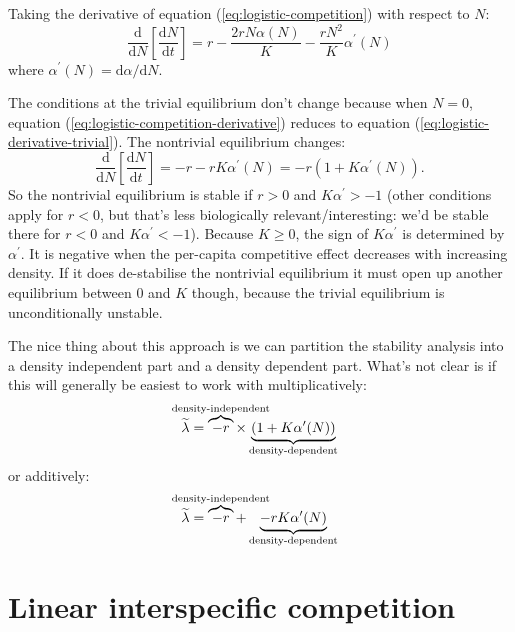 \documentclass[12pt,a4paper]{article}
\newcommand{\ud}{\mathrm{d}}
\begin{document}
Taking the derivative of equation (\ref{eq:logistic-competition}) with
respect to $N$:
\begin{equation}
  \label{eq:logistic-competition-derivative}
  \frac{\ud}{\ud N}\left[\frac{\ud N}{\ud t}\right]
   = r - \frac{2 r N\alpha(N)}{K} - \frac{rN^2}{K}\alpha^\prime(N)
\end{equation}
where $\alpha^\prime(N) = \ud \alpha/\ud N$.

The conditions at the trivial equilibrium don't change because when $N
= 0$, equation (\ref{eq:logistic-competition-derivative}) reduces to
equation (\ref{eq:logistic-derivative-trivial}).  The nontrivial
equilibrium changes:
\begin{equation}
  \label{eq:logistic-competition-derivative-nontrivial}
  \frac{\ud}{\ud N}\left[\frac{\ud N}{\ud t}\right]
   = -r - rK\alpha^\prime(N) = -r(1 + K\alpha^\prime(N)).
\end{equation}
So the nontrivial equilibrium is stable if $r > 0$ and $K\alpha^\prime
> -1$ (other conditions apply for $r < 0$, but that's less
biologically relevant/interesting: we'd be stable there for $r < 0$
and $K\alpha^\prime < -1$).  Because $K \geq 0$, the sign of
$K\alpha^\prime$ is determined by $\alpha^\prime$.  It is negative
when the per-capita competitive effect decreases with increasing
density.  If it does de-stabilise the nontrivial equilibrium it must
open up another equilibrium between 0 and $K$ though, because the
trivial equilibrium is unconditionally unstable.

The nice thing about this approach is we can partition the stability
analysis into a density independent part and a density dependent
part.  What's not clear is if this will generally be easiest to work
with multiplicatively:
\begin{equation}
  \label{eq:logistic-comptition-partition-multiplicative}
  \widetilde \lambda =
  \overbrace{-r}^{\mathclap{\text{density-independent}}}
  \times
  \underbrace{(1 + K\alpha^\prime(N))}_{\text{density-dependent}}
\end{equation}
or additively:
\begin{equation}
  \label{eq:logistic-comptition-partition-additive}
  \widetilde \lambda =
  \overbrace{-r}^{\mathclap{\text{density-independent}}}
  +
  \underbrace{-rK\alpha^\prime(N)}_{\text{density-dependent}}
\end{equation}

\section{Linear interspecific competition}
\end{document}
